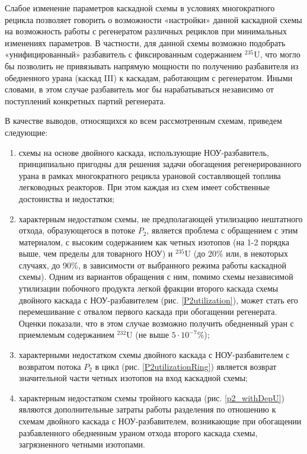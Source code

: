 {Слабое изменение параметров каскадной схемы в условиях многократного рецикла позволяет говорить о возможности «настройки» данной каскадной схемы на возможность работы с регенератом различных рециклов при минимальных изменениях параметров. В частности, для данной схемы возможно подобрать «унифицированный» разбавитель с фиксированным содержанием $^{235}$U, что могло бы позволить не привязывать напрямую мощности по получению разбавителя из обедненного урана (каскад III) к каскадам, работающим с регенератом. Иными словами, в этом случае разбавитель мог бы нарабатываться независимо от поступлений конкретных партий регенерата.


В качестве выводов, относящихся ко всем рассмотренным схемам, приведем следующие:
\begin{enumerate}
    \item схемы на основе двойного каскада, использующие НОУ-разбавитель, принципиально пригодны для решения задачи обогащения регенерированного урана в рамках многократного рецикла урановой составляющей топлива легководных реакторов. При этом каждая из схем имеет собственные достоинства и недостатки;
    \item характерным недостатком схемы, не предполагающей утилизацию нештатного отхода, образующегося в потоке $P_2$, является проблема с обращением с этим материалом, с высоким содержанием как четных изотопов (на 1-2 порядка выше, чем пределы для товарного НОУ) и $^{235}$U (до 20\% или, в некоторых случаях, до 90\%, в зависимости от выбранного режима работы каскадной схемы). Одним из вариантов обращения с ним, помимо схемы независимой утилизации побочного продукта легкой фракции второго каскада схемы двойного каскада с НОУ-разбавителем (рис. \ref{P2utilization}), может стать его перемешивание с отвалом первого каскада при обогащении регенерата. Оценки показали, что в этом случае возможно получить обедненный уран с приемлемым содержанием $^{232}$U (не выше $5\cdot10^{-7}$\%);
    \item характерными недостатком схемы двойного каскада с НОУ-разбавителем с возвратом потока $P_2$ в цикл (рис. \ref{P2utilizationRing}) является возврат значительной части четных изотопов на вход каскадной схемы;
    \item характерным недостатком схемы тройного каскада (рис. \ref{p2_withDepU}) являются дополнительные затраты работы разделения по отношению к схемам двойного каскада с НОУ-разбавителем, возникающие при обогащении разбавленного обедненным ураном отхода второго каскада схемы, загрязненного четными изотопами.
  \end{enumerate}

}
